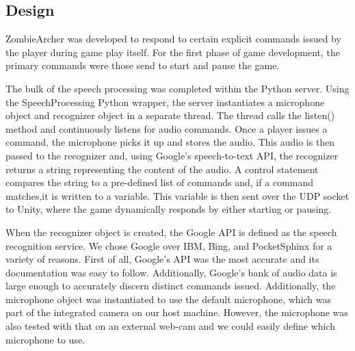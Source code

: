 \documentclass[titlepage, 12pt]{scrartcl}
\begin{document}
    \subsection{Design}
        ZombieArcher was developed to respond to certain explicit commands issued by the player during game play itself. For the first phase of game development, the primary commands were those send to start and pause the game. \par
        The bulk of the speech processing was completed within the Python server. Using the SpeechProcessing Python wrapper, the server instantiates a microphone object and recognizer object in a separate thread. The thread calls the listen() method and continuously listens for audio commands. Once a player issues a command, the microphone picks it up and stores the audio. This audio is then passed to the recognizer and, using Google's speech-to-text API, the recognizer returns a string representing the content of the audio. A control statement compares the string to a pre-defined list of commands and, if a command matches,it is written to a variable. This variable is then sent over the UDP socket to Unity, where the game dynamically responds by either starting or pausing. \par
        When the recognizer object is created, the Google API is defined as the speech recognition service. We chose Google over IBM, Bing, and PocketSphinx for a variety of reasons. First of all, Google's API was the most accurate and its documentation was easy to follow. Additionally, Google's bank of audio data is large enough to accurately discern distinct commands issued. Additionally, the microphone object was instantiated to use the default microphone, which was part of the integrated camera on our host machine. However, the microphone was also tested with that on an external web-cam and we could easily define which microphone to use. \par
\end{document}
